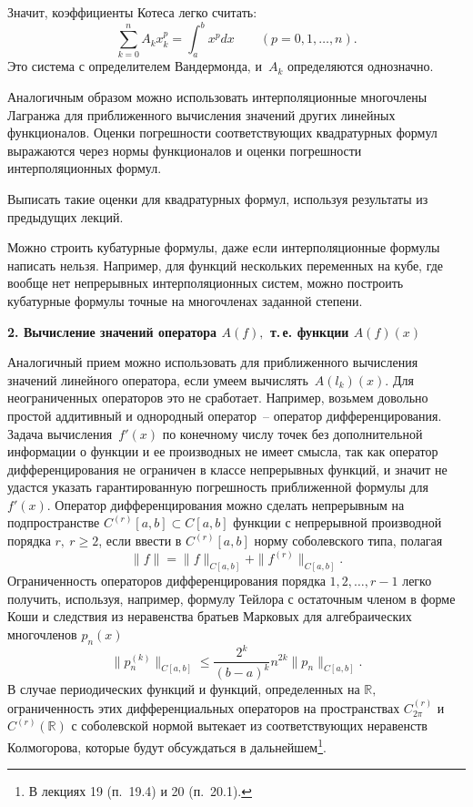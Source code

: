 Значит, коэффициенты Котеса легко считать:
\[
  \sum\limits_{k=0}^n A_k x^p_k=\int_a^b x^p dx\qquad (p=0,1,\dots ,n).
\]
Это система с определителем Вандермонда, и~$A_k$ определяются однозначно.

Аналогичным образом можно использовать интерполяционные
многочлены Лагранжа для приближенного вычисления значений
других линейных функционалов. Оценки погрешности
соответствующих квадратурных формул выражаются через нормы
функционалов и оценки погрешности интерполяционных формул.

\begin{ex}
Выписать такие оценки для квадратурных формул, используя
результаты из предыдущих лекций.
\end{ex}

Можно строить кубатурные формулы, даже если
интерполяционные формулы написать нельзя. Например, для функций нескольких переменных
на кубе, где вообще нет непрерывных интерполяционных
систем, можно построить кубатурные формулы точные на многочленах заданной степени.
\vspace{3mm}

{\bf 2. Вычисление {значений} оператора ${A(f)},$
{т.\,е. функции ${A(f)(x)}$}}
\vspace{3mm}

Аналогичный прием можно использовать для приближенного
вычисления значений линейного оператора, если умеем
вычислять~$A(l_k)(x).$ Для неограниченных операторов это не
сработает. Например, возьмем
довольно простой аддитивный и однородный оператор~-- оператор дифференцирования.
Задача вычисления~$f'(x)$ по конечному числу точек {без
дополнительной информации о} {функции и ее производных} не имеет смысла,
так как оператор дифференцирования не ограничен в классе непрерывных
функций, {и значит не удастся указать} {гарантированную погрешность
приближенной формулы для~$f'(x).$} Оператор дифференцирования
можно сделать непрерывным на подпространстве $C^{(r)}[a,b]\subset C[a,b]$ функции с
непрерывной производной порядка $r,\ r\ge 2$, если
ввести в $C^{(r)}[a,b]$ норму соболевского типа,
полагая
$$
\|f\|=\|f\|_{C[a,b]}+\|f^{(r)}\|_{C[a,b]}.
$$
Ограниченность операторов дифференцирования порядка
$1,2,\ldots,r-1$ легко получить, используя, например, формулу Тейлора
с остаточным членом в форме Коши и следствия из неравенства братьев Марковых
для алгебраических многочленов $p_n(x)$
$$
\|p_n^{(k)}\|_{C[a,b]}\le \dfrac{2^{k}}{(b-a)^k}  n^{2k}\|p_n\|_{C[a,b]}.
$$
В случае периодических
функций и функций, определенных на $\mathbb R,$
ограниченность этих дифференциальных операторов на
пространствах $C^{(r)}_{2\pi}$ и $C^{(r)}(\mathbb R)$ с
соболевской нормой вытекает из соответствующих неравенств Колмогорова, которые
будут обсуждаться в дальнейшем\footnote{В лекциях 19 (п.~19.4) и 20 (п.~20.1).}.
